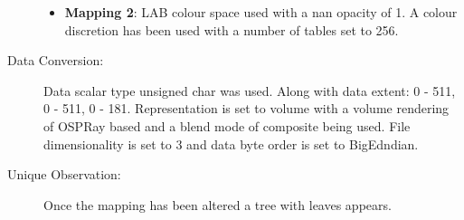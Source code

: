 \begin{description}
	\begin{itemize}
		\tightlist
		\item
		\textbf{Mapping 2}:
		\hfill \break 
			LAB colour space used with a nan opacity of 1. A colour discretion has been used with a number of tables set to 256.
	\end{itemize}
	\item[Data Conversion:] 
	\hfill \break 
		Data scalar type unsigned char was used. Along with data extent: 0 - 511, 0 - 511, 0 - 181. Representation is set to volume with a volume rendering of OSPRay based and a blend mode of composite being used. File dimensionality is set to 3 and data byte order is set to BigEdndian.
	\item[Unique Observation:]
	\hfill \break
		Once the mapping has been altered a tree with leaves appears.
\end{description}